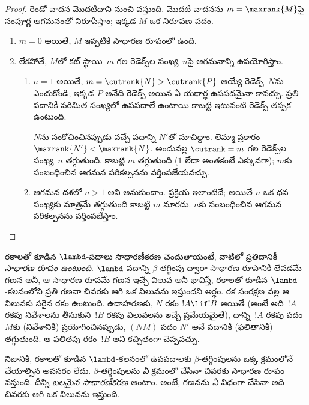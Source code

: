 \documentclass[../../../include/open-logic-section]{subfiles}
\begin{document}
\begin{proof}
  రెండో వాదన మొదటిదాని నుంచి వస్తుంది. మొదటి వాదనను
  $m=\maxrank{M}$పై సంపూర్ణ ఆగమనంతో నిరూపిస్తాం; ఇక్కడ $M$ ఒక నిరూపణ పదం.
  \begin{enumerate}

  \item $m=0$ అయితే, $M$ ఇప్పటికే సాధారణ రూపంలో ఉంది.
  \item
    లేకపోతే, $M$లో కట్ స్థాయి~$m$ గల రెడెక్స్‌ల సంఖ్య~$n$పై
    ఆగమనాన్ని ఉపయోగిస్తాం.
    \begin{enumerate}
    \item $n=1$ అయితే, $m = \cutrank{N} >
      \cutrank{P}$ అయ్యే రెడెక్స్~$N$ను ఎంచుకోండి; ఇక్కడ $P$ అనేది
      రెడెక్స్ అయిన ఏ యథార్థ ఉపపదమైనా కావచ్చు. ప్రతి పదానికీ
      పరిమిత సంఖ్యలో ఉపపదాలే ఉంటాయి కాబట్టి ఇటువంటి రెడెక్స్ తప్పక ఉంటుంది.

      $N$ను సంకోచించినప్పుడు వచ్చే పదాన్ని $N'$తో సూచిద్దాం. లెమ్మా ప్రకారం
      $\maxrank{N'} < \maxrank{N}$. అందువల్ల $\cutrank=m$ గల
      రెడెక్స్‌ల సంఖ్య~$n$ తగ్గుతుంది. కాబట్టి $m$
      తగ్గుతుంది ($1$ లేదా అంతకంటే ఎక్కువగా); $m$కు సంబంధించిన
      ఆగమన పరికల్పనను వర్తింపజేయవచ్చు.
    \item ఆగమన దశలో $n>1$ అని అనుకుందాం. ప్రక్రియ ఇలాంటిదే;
      అయితే $n$ ఒక ధన సంఖ్యకు మాత్రమే తగ్గుతుంది కాబట్టి $m$
      మారదు. $n$కు సంబంధించిన ఆగమన పరికల్పనను వర్తింపజేస్తాం.
    \end{enumerate}
\end{enumerate}
\end{proof}

రకాలతో కూడిన $\lambd$-పదాలు సాధారణీకరణ చెందుతాయంటే, వాటిలో ప్రతిదానికీ \emph{సాధారణ రూపం ఉంటుంది}. $\lambd$-పదాన్ని $\beta$-తగ్గింపు ద్వారా సాధారణ రూపానికి తేవడమే గణన అనీ, ఆ సాధారణ రూపమే గణన ఇచ్చే విలువ అనీ భావిస్తే, రకాలతో కూడిన $\lambd$-కలనంలోని ప్రతి గణనా చివరకు ఆగి ఒక విలువను ఇస్తుందని అర్థం. రక సంరక్షణ వల్ల ఆ విలువకు సరైన రకం ఉంటుంది. ఉదాహరణకు, $N$ రకం $!A \lif !B$ అయితే (అంటే అది~$!A$ రకపు నివేశాలను తీసుకుని~$!B$ రకపు విలువలను ఇచ్చే ప్రమేయమైతే), దాన్ని~$!A$ రకపు పదం~$M$కు (నివేశానికి) ప్రయోగించినప్పుడు, $(NM)$ పదం $N'$ అనే పదానికి (ఫలితానికి) తగ్గుతుంది. ఆ ఫలితపు రకం~$!B$ అని కచ్చితంగా చెప్పవచ్చు.

నిజానికి, రకాలతో కూడిన $\lambd$-కలనంలో ఉపపదాలకు $\beta$-తగ్గింపులను ఒక్క క్రమంలోనే చేయాల్సిన అవసరం లేదు. $\beta$-తగ్గింపులను \emph{ఏ} క్రమంలో చేసినా చివరకు సాధారణ రూపం వస్తుంది. దీన్ని \emph{బలమైన సాధారణీకరణ} అంటాం. అంటే, గణనను \emph{ఏ} విధంగా చేసినా అది చివరకు ఆగి ఒక విలువను ఇస్తుంది.
\end{document}
